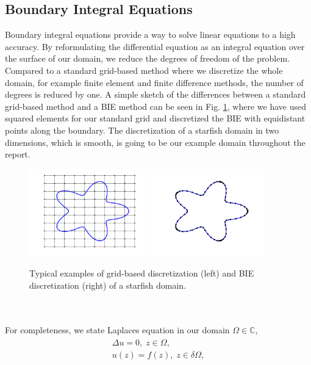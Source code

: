 \documentclass[a4paper,10pt]{article}
\begin{document}
\subsection*{Boundary Integral Equations}
Boundary integral equations provide a way to solve linear equations to a high accuracy. By reformulating the differential equation as an integral equation over the surface of our domain, we reduce the degrees of freedom of the problem. Compared to a standard grid-based method where we discretize the whole domain, for example finite element and finite difference methods, the number of degrees is reduced by one. A simple sketch of the differences between a standard grid-based method and a BIE method can be seen in Fig. \ref{fig:disc}, where we have used squared elements for our standard grid and discretized the BIE with equidistant points along the boundary. The discretization of a starfish domain in two dimensions, which is smooth, is going to be our example domain throughout the report. 
\begin{figure}[ht]
	\begin{center}
		\includegraphics[width=0.45\textwidth]{Graphics/starfish_grid.png}
		\includegraphics[width =0.45\textwidth]{Graphics/starfish_BIE.png}
	\end{center}
	\caption{Typical examples of grid-based discretization (left) and BIE discretization (right) of a starfish domain.}
	\label{fig:disc}
\end{figure}
\\ \\
For completeness, we state Laplaces equation in our domain $\Omega\in\mathbb{C}$, 
\begin{align}
	\begin{split}
		\Delta u = 0, \; z\in\Omega, \\
		u(z) = f(z), \; z\in\delta\Omega,  
	\end{split}
	\label{eq:laplace}
\end{align}
\end{document}
